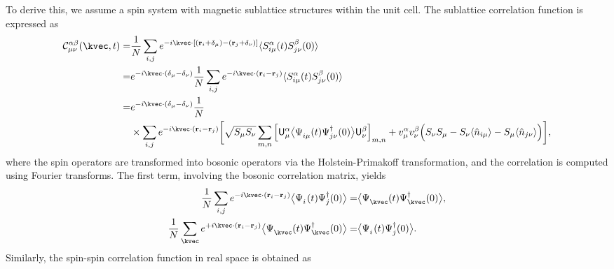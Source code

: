 To derive this, we assume a spin system with magnetic sublattice structures within the unit cell. The sublattice correlation function is expressed as
\begin{align}
    \mathcal{C}^{\alpha\beta}_{\mu\nu} (\kvec, t) 
    = & \frac{1}{N} \sum_{i,j} e^{ - i \kvec \cdot [(\mathbf{r}_{i} + \mathbf{\delta}_{\mu}) - (\mathbf{r}_{j} + \mathbf{\delta}_{\nu})]} \langle S_{i\mu}^{\alpha}(t) S_{j\nu}^{\beta}(0) \rangle \\
    = & e^{ - i \kvec \cdot (\mathbf{\delta}_{\mu} - \mathbf{\delta}_{\nu})}  
    \frac{1}{N} \sum_{i,j} e^{ - i \kvec \cdot (\mathbf{r}_{i} - \mathbf{r}_{j} )} 
    \langle S_{i\mu}^{\alpha}(t) S_{j\nu}^{\beta}(0) \rangle \\
    = & e^{ - i \kvec \cdot (\mathbf{\delta}_{\mu} - \mathbf{\delta}_{\nu})}  
    \frac{1}{N}  \\
    & \times \sum_{i,j} e^{ - i \kvec \cdot (\mathbf{r}_{i} - \mathbf{r}_{j} )} 
    \bigg[
    \sqrt{S_{\mu}S_{\nu}} \sum_{m,n}
    \Big[ \mathsf{U}^{\alpha}_{\mu}
    \big\langle \Psi_{i\mu}^{\phantom \dagger}(t) \Psi_{j\nu}^{\dagger}(0) \big\rangle
    \mathsf{U}^{\beta}_{\nu} \Big]_{m,n} 
    + v_{\mu}^{\alpha} v_{\nu}^{\beta}
    \Big( S_{\nu} S_{\mu} - S_{\nu}\langle \hat{n}_{i\mu} \rangle - S_{\mu}\langle \hat{n}_{j\nu} \rangle \Big)
    \bigg], 
    \nonumber
\end{align}
where the spin operators are transformed into bosonic operators via the Holstein-Primakoff transformation, and the correlation is computed using Fourier transforms. The first term, involving the bosonic correlation matrix, yields
\begin{subequations}
    \begin{align}
        \frac{1}{N} \sum_{i,j}   
        e^{ - i \kvec \cdot (\mathbf{r}_{i} - \mathbf{r}_{j} )} 
        \big\langle \Psi_{i}^{\phantom \dagger}(t) \Psi_{j}^{\dagger}(0) \big\rangle 
        = &
        \big\langle \Psi_{\kvec}^{\phantom \dagger}(t) \Psi_{\kvec}^{\dagger}(0) \big\rangle,
        \\
        \frac{1}{N} \sum_{\kvec} 
        e^{ + i \kvec \cdot (\mathbf{r}_{i} - \mathbf{r}_{j} )} 
        \big\langle \Psi_{\kvec}^{\phantom \dagger}(t) \Psi_{\kvec}^{\dagger}(0) \big\rangle 
        = &
        \big\langle \Psi_{i}^{\phantom \dagger}(t) \Psi_{j}^{\dagger}(0) \big\rangle.
    \end{align}
\end{subequations}
Similarly, the spin-spin correlation function in real space is obtained as
